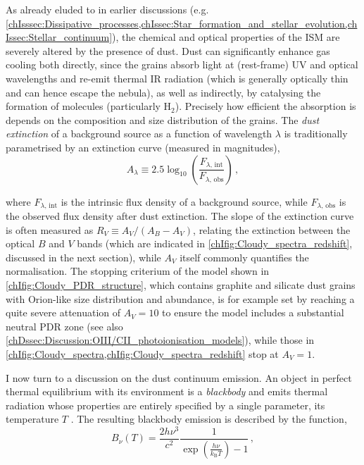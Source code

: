 As already eluded to in earlier discussions (e.g. \cref{chIsssec:Dissipative_processes,chIssec:Star_formation_and_stellar_evolution,chIssec:Stellar_continuum}), the chemical and optical properties of the ISM are severely altered by the presence of dust. Dust can significantly enhance gas cooling both directly, since the grains absorb light at (rest-frame) UV and optical wavelengths and re-emit thermal IR radiation (which is generally optically thin and can hence escape the nebula), as well as indirectly, by catalysing the formation of molecules (particularly $\mathrm{H_2}$). Precisely how efficient the absorption is depends on the composition and size distribution of the grains. The \textit{dust extinction} of a background source as a function of wavelength $\lambda$ is traditionally parametrised by an extinction curve (measured in magnitudes),
\begin{equation}
    \label{chIeq:Dust_extinction}
    A_\lambda \equiv 2.5 \log_{10} \left( \frac{F_{\lambda, \, \text{int}}}{F_{\lambda, \, \text{obs}}} \right) \, ,
\end{equation}

\noindent where $F_{\lambda, \, \text{int}}$ is the intrinsic flux density of a background source, while $F_{\lambda, \, \text{obs}}$ is the observed flux density after dust extinction. The slope of the extinction curve is often measured as $R_V \equiv A_V/(A_B - A_V)$, relating the extinction between the optical $B$ and $V$ bands (which are indicated in \cref{chIfig:Cloudy_spectra_redshift}, discussed in the next section), while $A_V$ itself commonly quantifies the normalisation. The stopping criterium of the  model shown in \cref{chIfig:Cloudy_PDR_structure}, which contains graphite and silicate dust grains with Orion-like size distribution and abundance, is for example set by reaching a quite severe attenuation of $A_V = 10$ to ensure the model includes a substantial neutral PDR zone (see also \cref{chDssec:Discussion:OIII/CII_photoionisation_models}), while those in \cref{chIfig:Cloudy_spectra,chIfig:Cloudy_spectra_redshift} stop at $A_V = 1$.

I now turn to a discussion on the dust continuum emission. An object in perfect thermal equilibrium with its environment is a \textit{blackbody} and emits thermal radiation whose properties are entirely specified by a single parameter, its temperature $T$ \citep{1901AnP...309..553P}. The resulting blackbody emission is described by the \citeauthor{1901AnP...309..553P} function,
\begin{equation}
    \label{chIeq:Planck_function}
    B_\nu (T) = \frac{2 h \nu^3}{c^2} \frac{1}{\exp \left( \frac{h \nu}{k_\text{B} T} \right) - 1} \, ,
\end{equation}

